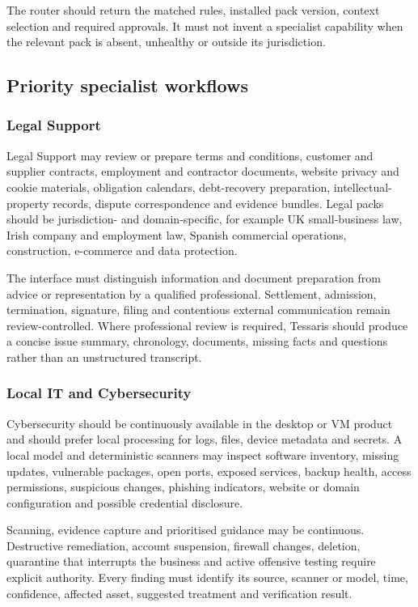 The router should return the matched rules, installed pack version, context
selection and required approvals.  It must not invent a specialist capability
when the relevant pack is absent, unhealthy or outside its jurisdiction.

\subsection{Priority specialist workflows}

\subsubsection{Legal Support}

Legal Support may review or prepare terms and conditions, customer and supplier
contracts, employment and contractor documents, website privacy and cookie
materials, obligation calendars, debt-recovery preparation, intellectual-
property records, dispute correspondence and evidence bundles.  Legal packs
should be jurisdiction- and domain-specific, for example UK small-business law,
Irish company and employment law, Spanish commercial operations, construction,
e-commerce and data protection.

The interface must distinguish information and document preparation from advice
or representation by a qualified professional.  Settlement, admission,
termination, signature, filing and contentious external communication remain
review-controlled.  Where professional review is required, Tessaris should
produce a concise issue summary, chronology, documents, missing facts and
questions rather than an unstructured transcript.

\subsubsection{Local IT and Cybersecurity}

Cybersecurity should be continuously available in the desktop or VM product and
should prefer local processing for logs, files, device metadata and secrets.  A
local model and deterministic scanners may inspect software inventory, missing
updates, vulnerable packages, open ports, exposed services, backup health,
access permissions, suspicious changes, phishing indicators, website or domain
configuration and possible credential disclosure.

Scanning, evidence capture and prioritised guidance may be continuous.
Destructive remediation, account suspension, firewall changes, deletion,
quarantine that interrupts the business and active offensive testing require
explicit authority.  Every finding must identify its source, scanner or model,
time, confidence, affected asset, suggested treatment and verification result.

